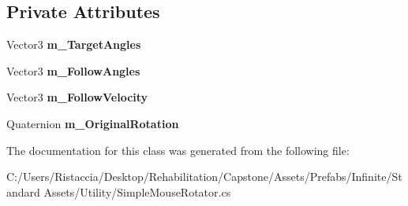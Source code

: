 \subsection*{Private Attributes}
\begin{DoxyCompactItemize}
\item 
\mbox{\label{class_unity_standard_assets_1_1_utility_1_1_simple_mouse_rotator_acb86bd9460a98657cd562e7ee5f28640}} 
Vector3 {\bfseries m\+\_\+\+Target\+Angles}
\item 
\mbox{\label{class_unity_standard_assets_1_1_utility_1_1_simple_mouse_rotator_a4693522bed655ebe3476c523176041b2}} 
Vector3 {\bfseries m\+\_\+\+Follow\+Angles}
\item 
\mbox{\label{class_unity_standard_assets_1_1_utility_1_1_simple_mouse_rotator_aa21aefba3492376b19ee584a5bac6f85}} 
Vector3 {\bfseries m\+\_\+\+Follow\+Velocity}
\item 
\mbox{\label{class_unity_standard_assets_1_1_utility_1_1_simple_mouse_rotator_a85d1daca2b83c3661545cf7ee6a92b94}} 
Quaternion {\bfseries m\+\_\+\+Original\+Rotation}
\end{DoxyCompactItemize}


The documentation for this class was generated from the following file\+:\begin{DoxyCompactItemize}
\item 
C\+:/\+Users/\+Ristaccia/\+Desktop/\+Rehabilitation/\+Capstone/\+Assets/\+Prefabs/\+Infinite/\+Standard Assets/\+Utility/Simple\+Mouse\+Rotator.\+cs\end{DoxyCompactItemize}
